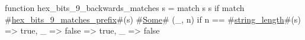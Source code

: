function hex_bits_9_backwards_matches s = match s {
  s if match #\hyperref[sailRISCVzhexzybitszy9zymatcheszyprefix]{hex\_bits\_9\_matches\_prefix}#(s) {
    #\hyperref[sailRISCVzSome]{Some}# (_, n) if n == #\hyperref[sailRISCVzstringzylength]{string\_length}#(s) => true,
    _ => false
  } => true,
  _ => false
}
